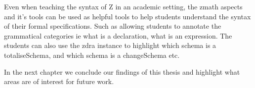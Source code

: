 Even when teaching the syntax of Z in an academic setting, the \gls{zmath} aspects and it's tools can be used as helpful tools to help students understand the syntax of their formal specifications.
Such as allowing students to annotate the grammatical categories ie what is a declaration, what is an expression. The students can also use the \gls{zdra} instance to highlight which schema is a totaliseSchema, and which schema is a changeSchema etc.

In the next chapter we conclude our findings of this thesis and highlight what areas are of interest for future work.

%
%
%
%
%
